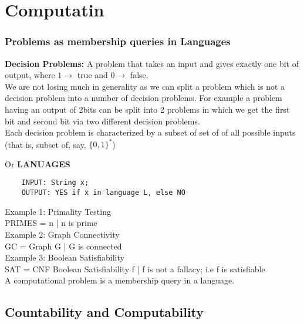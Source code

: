\chapter{Computatin}

\subsection{Problems as membership queries in Languages}

\textbf{Decision Problems:} A problem that takes an input and gives
exactly one bit of output, where $1 \rightarrow$ true and 
$0 \rightarrow$ false.\\

We are not losing much in generality as we can split a problem which
is not a decision problem into a number of decision problems. For
example a problem having an output of 2bits can be split into
2 problems in which we get the first bit and second bit via two
different decision problems.\\

Each decision problem is characterized by a subset of set of
of all possible inputs (that is, subset of, say, ${\{0, 1\}}^{*}$)\\

\begin{center}
    Or \textbf{LANUAGES}
\end{center}

\begin{lstlisting}
    INPUT: String x;
    OUTPUT: YES if x in language L, else NO
\end{lstlisting}

Example 1: Primality Testing\\
PRIMES = {n | n is prime}\\

Example 2: Graph Connectivity\\
GC = {Graph G | G is connected}\\

Example 3: Boolean Satisfiability\\
SAT = {CNF Boolean Satisfiability f | f is not a fallacy; i.e f 
is satisfiable}\\

A computational problem is a membership query in a language.

\section{Countability and Computability}


